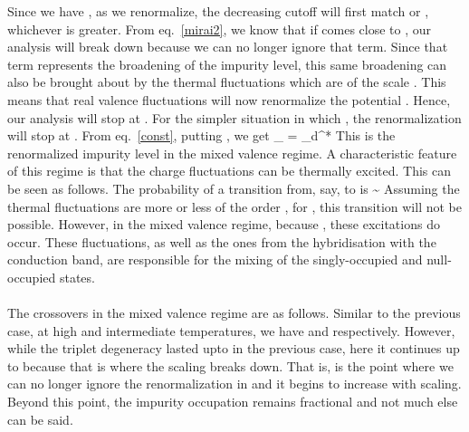 \documentclass[14pt]{extarticle}
\numberwithin{equation}{section}
\begin{document}
Since we have , as we renormalize, the decreasing cutoff will first match \il{\Delta} or , whichever is greater. From eq.~\ref{mirai2}, we know that if  comes close to \il{\Delta}, our analysis will break down because we can no longer ignore that term. Since that term represents the broadening of the impurity level, this same broadening can also be brought about by the thermal fluctuations which are of the scale . This means that real valence fluctuations will now renormalize the potential . Hence, our analysis will stop at . For the simpler situation in which , the renormalization will stop at . From eq.~\ref{const}, putting , we get
\beq
{}_ = \epsilon_d^*
\eeq
This is the renormalized impurity level in the mixed valence regime. A characteristic feature of this regime is that the charge fluctuations can be thermally excited. This can be seen as follows. The probability of  a transition from, say,  to  is
\beq
\sim {}
\eeq
Assuming the thermal fluctuations are more or less of the order \il{\Delta}, for , this transition will not be possible. However, in the mixed valence regime, because , these excitations do occur. These fluctuations, as well as the ones from the hybridisation with the conduction band, are responsible for the mixing of the singly-occupied and null-occupied states.\\\\
The crossovers in the mixed valence regime are as follows. Similar to the previous case, at high and intermediate temperatures, we have  and  respectively. However, while the triplet degeneracy lasted upto  in the previous case, here it continues up to  because that is where the scaling breaks down. That is,  is the point where we can no longer ignore the renormalization in  and it begins to increase with scaling. Beyond this point, the impurity occupation remains fractional and not much else can be said.
\end{document}
